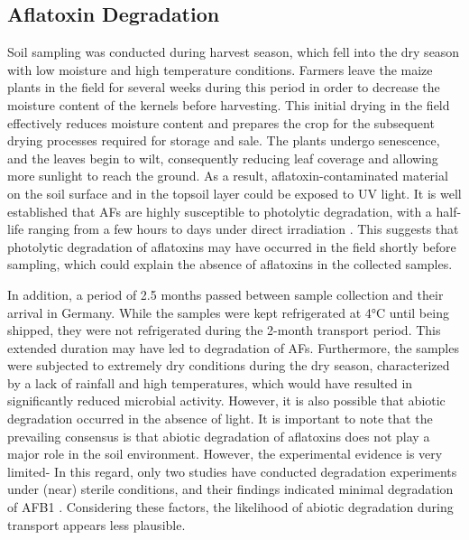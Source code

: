 \begin{refsection}
\subsection{Aflatoxin Degradation}

Soil sampling was conducted during harvest season, which fell into the dry season with low moisture and high temperature conditions. Farmers leave the maize plants in the field for several weeks during this period in order to decrease the moisture content of the kernels before harvesting. This initial drying in the field effectively reduces moisture content and prepares the crop for the subsequent drying processes required for storage and sale. The plants undergo senescence, and the leaves begin to wilt, consequently reducing leaf coverage and allowing more sunlight to reach the ground. As a result, aflatoxin-contaminated material on the soil surface and in the topsoil layer could be exposed to UV light. It is well established that AFs are highly susceptible to photolytic degradation, with a half-life ranging from a few hours to days under direct irradiation \citep{diao2015ultraviolet}. This suggests that photolytic degradation of aflatoxins may have occurred in the field shortly before sampling, which could explain the absence of aflatoxins in the collected samples. 

In addition, a period of 2.5 months passed between sample collection and their arrival in Germany. While the samples were kept refrigerated at 4°C until being shipped, they were not refrigerated during the 2-month transport period. This extended duration may have led to degradation of AFs. Furthermore, the samples were subjected to extremely dry conditions during the dry season, characterized by a lack of rainfall and high temperatures, which would have resulted in significantly reduced microbial activity. However, it is also possible that abiotic degradation occurred in the absence of light. It is important to note that the prevailing consensus is that abiotic degradation of aflatoxins does not play a major role in the soil environment. However, the experimental evidence is very limited- In this regard, only two studies have conducted degradation experiments under (near) sterile conditions, and their findings indicated minimal degradation of AFB1 \citep{accinelli2008aspergillus, starr2017solvent}. Considering these factors, the likelihood of abiotic degradation during transport appears less plausible.



\end{refsection}
